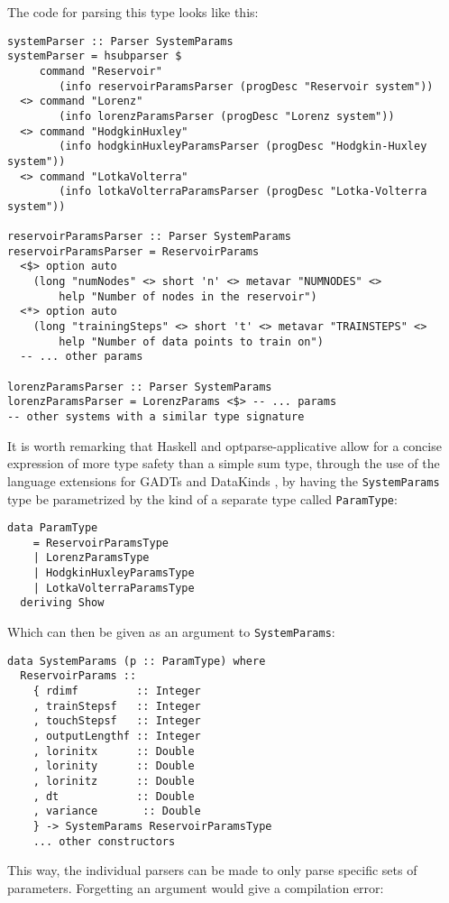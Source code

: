 The code for parsing this type looks like this:
\begin{verbatim}
systemParser :: Parser SystemParams
systemParser = hsubparser $ 
     command "Reservoir" 
        (info reservoirParamsParser (progDesc "Reservoir system"))
  <> command "Lorenz" 
        (info lorenzParamsParser (progDesc "Lorenz system"))
  <> command "HodgkinHuxley" 
        (info hodgkinHuxleyParamsParser (progDesc "Hodgkin-Huxley system"))
  <> command "LotkaVolterra" 
        (info lotkaVolterraParamsParser (progDesc "Lotka-Volterra system"))

reservoirParamsParser :: Parser SystemParams
reservoirParamsParser = ReservoirParams
  <$> option auto 
    (long "numNodes" <> short 'n' <> metavar "NUMNODES" <> 
        help "Number of nodes in the reservoir")
  <*> option auto 
    (long "trainingSteps" <> short 't' <> metavar "TRAINSTEPS" <> 
        help "Number of data points to train on")
  -- ... other params

lorenzParamsParser :: Parser SystemParams
lorenzParamsParser = LorenzParams <$> -- ... params
-- other systems with a similar type signature
\end{verbatim}

It is worth remarking that Haskell and optparse-applicative allow for a concise expression of more type safety than a simple sum type, through the use of the language extensions for GADTs \cite{ghc-gadts} and DataKinds \cite{ghc-data-kinds}, by having the \texttt{SystemParams} type be parametrized by the kind of a separate type called \texttt{ParamType}:

\begin{verbatim}
data ParamType
    = ReservoirParamsType 
    | LorenzParamsType 
    | HodgkinHuxleyParamsType 
    | LotkaVolterraParamsType
  deriving Show
\end{verbatim}

Which can then be given as an argument to \texttt{SystemParams}:
\begin{verbatim}
data SystemParams (p :: ParamType) where
  ReservoirParams :: 
    { rdimf         :: Integer
    , trainStepsf   :: Integer
    , touchStepsf   :: Integer
    , outputLengthf :: Integer
    , lorinitx      :: Double
    , lorinity      :: Double
    , lorinitz      :: Double
    , dt            :: Double
    , variance       :: Double
    } -> SystemParams ReservoirParamsType
    ... other constructors
\end{verbatim}

This way, the individual parsers can be made to only parse specific sets of parameters. Forgetting an argument would give a compilation error:


